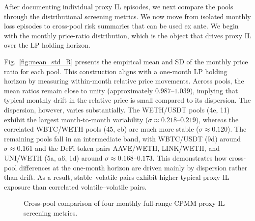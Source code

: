 \documentclass[10pt,conference,compsocconf]{IEEEtran}
\begin{document}
After documenting individual proxy IL episodes, we next compare the pools through the distributional screening metrics. 
We now move from isolated monthly loss episodes to cross-pool risk summaries that can be used ex ante. 
We begin with the monthly price-ratio distribution, which is the object that drives proxy IL over the LP holding horizon.


Fig.~\ref{fig:mean_std_R} presents the empirical mean and SD of the monthly price ratio for each pool.
This construction aligns with a one-month LP holding horizon by measuring within-month relative price movements.
Across pools, the mean ratios remain close to unity (approximately \(0.987\)--\(1.039\)), implying that typical monthly drift in the relative price is small compared to its dispersion.
The dispersion, however, varies substantially. The WETH/USDT pools (4e, 11) exhibit the largest month-to-month variability
(\(\sigma \approx 0.218\)--\(0.219\)), whereas the correlated WBTC/WETH pools (45, cb) are much more stable
(\(\sigma \approx 0.120\)).
The remaining pools fall in an intermediate band, with WBTC/USDT (9d) around \(\sigma \approx 0.161\) and the DeFi token pairs AAVE/WETH, LINK/WETH, and UNI/WETH (5a, a6, 1d) around \(\sigma \approx 0.168\)--\(0.173\).
This demonstrates how cross-pool differences at the one-month horizon are driven mainly by dispersion rather than drift. 
As a result, stable--volatile pairs exhibit higher typical proxy IL exposure than correlated volatile--volatile pairs.

\begin{figure}[t]
\centering

\begin{minipage}[t]{0.35\textwidth}
\centering
\resizebox{\textwidth}{!}{%
    
}
\label{fig:mean_std_R}
\end{minipage}
\hfill
\begin{minipage}[t]{0.64\textwidth}
\centering
\resizebox{\textwidth}{!}{%
    
}
\caption{Cross-pool comparison of four monthly full-range CPMM proxy IL screening metrics.}
\label{fig:monthly_il_summary_metrics}
\end{minipage}

\end{figure}
\end{document}

